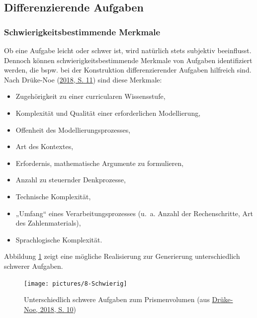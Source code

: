 \documentclass[
]{scrbook}
\providecommand{\tightlist}{%
  \setlength{\itemsep}{0pt}\setlength{\parskip}{0pt}}
\theoremstyle{definition}
\theoremstyle{definition}
\theoremstyle{definition}
\theoremstyle{definition}
\theoremstyle{remark}
\begin{document}
\hypertarget{differenzierende-aufgaben}{%
\subsection{Differenzierende Aufgaben}\label{differenzierende-aufgaben}}

\hypertarget{schwierigkeitsbestimmende-merkmale}{%
\subsubsection{Schwierigkeitsbestimmende Merkmale}\label{schwierigkeitsbestimmende-merkmale}}

Ob eine Aufgabe leicht oder schwer ist, wird natürlich stets subjektiv beeinflusst. Dennoch können schwierigkeitsbestimmende Merkmale von Aufgaben identifiziert werden, die bspw. bei der Konstruktion differenzierender Aufgaben hilfreich sind. Nach Drüke-Noe (\protect\hyperlink{ref-Druke-Noe2018}{2018, S. 11}) sind diese Merkmale:

\begin{itemize}
\tightlist
\item
  Zugehörigkeit zu einer curricularen Wissensstufe,
\item
  Komplexität und Qualität einer erforderlichen Modellierung,
\item
  Offenheit des Modellierungsprozesses,
\item
  Art des Kontextes,
\item
  Erfordernis, mathematische Argumente zu formulieren,
\item
  Anzahl zu steuernder Denkprozesse,
\item
  Technische Komplexität,
\item
  „Umfang`` eines Verarbeitungsprozesses (u.~a. Anzahl der Rechenschritte, Art des Zahlenmaterials),
\item
  Sprachlogische Komplexität.
\end{itemize}

Abbildung \ref{fig:Schwierig} zeigt eine mögliche Realisierung zur Generierung unterschiedlich schwerer Aufgaben.



\begin{figure}

{\centering \texttt{[image: pictures/8-Schwierig]} 

}

\caption{Unterschiedlich schwere Aufgaben zum Prismenvolumen (aus \protect\hyperlink{ref-Druke-Noe2018}{Drüke-Noe, 2018, S. 10})}\label{fig:Schwierig}
\end{figure}
\end{document}
